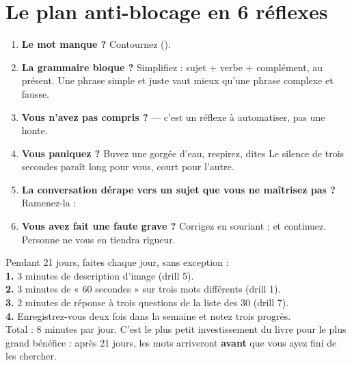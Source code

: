 \section{Le plan anti-blocage en 6 réflexes}
\begin{enumerate}
  \item \textbf{Le mot manque ?} Contournez ().
  \item \textbf{La grammaire bloque ?} Simplifiez : sujet + verbe + complément, au présent.
  Une phrase simple et juste vaut mieux qu'une phrase complexe et fausse.
  \item \textbf{Vous n'avez pas compris ?} 
  --- c'est un réflexe à automatiser, pas une honte.
  \item \textbf{Vous paniquez ?} Buvez une gorgée d'eau, respirez, dites
   Le silence de trois secondes paraît long pour vous,
  court pour l'autre.
  \item \textbf{La conversation dérape vers un sujet que vous ne maîtrisez pas ?}
  Ramenez-la : 
  \item \textbf{Vous avez fait une faute grave ?} Corrigez en souriant :
   et continuez. Personne ne vous en tiendra rigueur.
\end{enumerate}

\begin{mission}
Pendant 21 jours, faites chaque jour, sans exception :\\
\textbf{1.} 3 minutes de description d'image (drill 5).\\
\textbf{2.} 3 minutes de « 60 secondes » sur trois mots différents (drill 1).\\
\textbf{3.} 2 minutes de réponse à trois questions de la liste des 30 (drill 7).\\
\textbf{4.} Enregistrez-vous deux fois dans la semaine et notez trois progrès.\\
Total : 8 minutes par jour. C'est le plus petit investissement du livre pour le plus grand
bénéfice : après 21 jours, les mots arriveront \textbf{avant} que vous ayez fini de les
chercher.
\end{mission}

